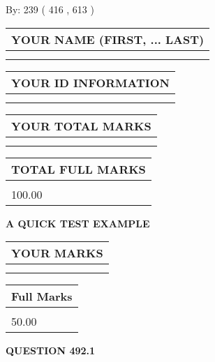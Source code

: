 \documentclass[12pt]{article}
\begin{document}
   
\hspace{1.0in} By: 
 239 ( 416 ,  613 )
   
   
   
   
\newpage 
\setcounter{page}{ 
   492001 } 
   
   
   
   
\noindent\begin{tabular}{|l|}
\hline
YOUR NAME (FIRST, ... LAST)  \\
\hline
 \\ 
 \\ 
\hline
\end{tabular}
\hspace{0.05in} \begin{tabular}{|l|}
\hline
 YOUR   ID   INFORMATION  \\
\hline
 \\ 
 \\ 
\hline
\end{tabular}
   
   
\vspace{0.2in}\noindent\begin{tabular}{|l|}
\hline
YOUR TOTAL MARKS  \\
\hline
 \\ 
 \\ 
\hline
\end{tabular}
\hspace{0.05in} \begin{tabular}{|l|}
\hline
TOTAL FULL MARKS  \\
\hline
 \\ 
100.00 \\
\hline
\end{tabular}
   
   
 \vspace{0.2in}
{\LARGE {\textbf{ A QUICK TEST EXAMPLE}}}
   
   
  
\vspace{0.2in}
  
\noindent\begin{tabular}{|l|}
\hline
 YOUR MARKS  \\
\hline
 \\ 
 \\ 
\hline
\end{tabular}
\hspace{0.05in} \begin{tabular}{|l|}
\hline
 Full Marks  \\
\hline
 \\ 
50.00 \\
\hline
\end{tabular}
{\textbf{\Large{QUESTION
492.1 
}}}
  
\end{document}
